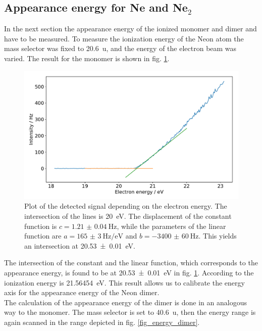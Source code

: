 \documentclass[a4paper,10pt]{article}
\begin{document}
\subsection{Appearance energy for Ne and Ne$_2$}
In the next section the appearance energy of the ionized monomer and dimer  and  have to be measured. To measure the ionization energy of the Neon atom the mass selector was fixed to \SI{20.6}{\atomicmassunit}, and the energy of the electron beam was varied. The result for the monomer is shown in fig. \ref{fig_energy_monomer}.
\begin{figure}[H]
	\centering
	\includegraphics[width = 0.8 \textwidth]{energy_ne.pdf}
	\caption{Plot of the detected signal depending on the electron energy. The intersection of the lines is \SI{20}{\electronvolt}. The displacement of the constant function is $c=\SI{1.21(4)}{\hertz}$, while the parameters of the linear function are $a = \SI{165(3)}{\hertz \per \electronvolt}$ and $b = \SI{-3400(60)}{\hertz}$. This yields an intersection at \SI{20.53(1)}{\electronvolt}. }
	\label{fig_energy_monomer}
\end{figure}
The intersection of the constant and the linear function, which corresponds to the appearance energy, is found to be at \SI{20.53(1)}{\electronvolt} in fig. \ref{fig_energy_monomer}. According to \cite{neon_nist} the ionization energy is \SI{21.56454}{\electronvolt}. This result allows us to calibrate the energy axis for the appearance energy of the Neon dimer. \\
The calculation of the appearance energy of the dimer is done in an analogous way to the monomer. The mass selector is set to \SI{40.6}{\atomicmassunit}, then the energy range is again scanned in the range depicted in fig. \ref{fig_energy_dimer}.
\end{document}
